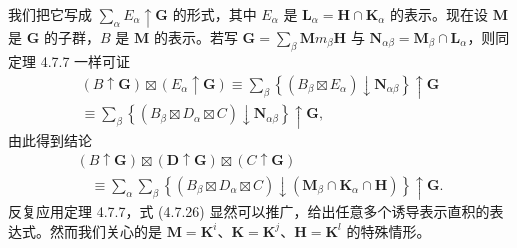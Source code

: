我们把它写成 $\sum_{\alpha}E_{\alpha} \uparrow \mathbf{G}$ 的形式，其中 $E_{\alpha}$ 是 $\mathbf{L}_{\alpha} = \mathbf{H} \cap \mathbf{K}_{\alpha}$ 的表示。现在设 $\mathbf{M}$ 是 $\mathbf{G}$ 的子群，$B$ 是 $\mathbf{M}$ 的表示。若写 $\mathbf{G} = \sum_{\beta}\mathbf{M}m_{\beta}\mathbf{H}$ 与 $\mathbf{N}_{\alpha\beta} = \mathbf{M}_{\beta} \cap \mathbf{L}_{\alpha}$，则同定理 4.7.7 一样可证
\begin{equation*}
\begin{array}{l}
(B \uparrow \mathbf{G}) \boxtimes (E_{\alpha} \uparrow \mathbf{G}) \equiv \sum_{\beta}\left\{(B_{\beta} \boxtimes E_{\alpha}) \downarrow \mathbf{N}_{\alpha\beta}\right\} \uparrow \mathbf{G}\\
\equiv \sum_{\beta}\left\{(B_{\beta} \boxtimes D_{\alpha} \boxtimes C) \downarrow \mathbf{N}_{\alpha\beta}\right\} \uparrow \mathbf{G},
\end{array}
\end{equation*}
由此得到结论
\begin{equation*}
\begin{array}{l}
(B \uparrow \mathbf{G}) \boxtimes (\mathbf{D} \uparrow \mathbf{G}) \boxtimes (C \uparrow \mathbf{G})\\
\quad \equiv \sum_{\alpha}\sum_{\beta}\left\{(B_{\beta} \boxtimes D_{\alpha} \boxtimes C) \downarrow (\mathbf{M}_{\beta} \cap \mathbf{K}_{\alpha} \cap \mathbf{H})\right\} \uparrow \mathbf{G}.
\end{array}
\tag{4.7.26}
\end{equation*}
反复应用定理 4.7.7，式 (4.7.26) 显然可以推广，给出任意多个诱导表示直积的表达式。然而我们关心的是 $\mathbf{M} = \mathbf{K}^{i}$、$\mathbf{K} = \mathbf{K}^{j}$、$\mathbf{H} = \mathbf{K}^{l}$ 的特殊情形。


